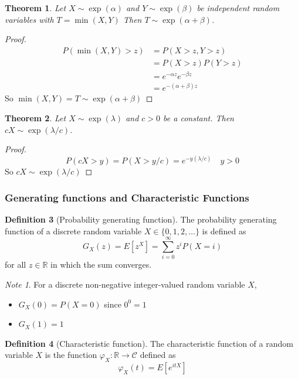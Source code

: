 \documentclass{article}
\theoremstyle{plain}
\newtheorem{theorem}{Theorem}[section]
\theoremstyle{definition}
\newtheorem{defn}[theorem]{Definition}
\theoremstyle{remark}
\newtheorem{note}{Note}
\numberwithin{equation}{section}
\newcommand{\R}{\mathbb{R}}
\newcommand{\Cs}{\mathcal{C}}
\begin{document}
\begin{theorem}\label{thm:exp_t_cond}
Let $X \sim \exp(\alpha)$ and $Y \sim \exp(\beta)$ be independent random variables with $T = \min(X,Y)$
Then $T \sim \exp(\alpha + \beta)$.
\end{theorem}

\begin{proof}
\begin{align*}
    P(\min(X,Y) > z) &= P(X > z, Y > z)\\
    &= P(X > z) P(Y > z)\\
    &= e^{-\alpha z} e^{-\beta z}\\
    &= e^{-(\alpha + \beta) z}
\end{align*}
So $\min(X,Y) = T \sim \exp(\alpha + \beta)$
\end{proof}

\begin{theorem} \label{thm:exp_scaling}
Let $X \sim \exp(\lambda)$ and $c > 0$ be a constant.
Then $cX \sim \exp(\lambda/c)$.
\end{theorem}

\begin{proof}
$$
    P(cX > y) = P(X > y/c) = e^{-y (\lambda/c)} \quad y > 0
$$
So $cX \sim \exp(\lambda/c)$
\end{proof}

\subsubsection{Generating functions and Characteristic Functions}

\begin{defn}[Probability generating function]
The probability generating function of a discrete random variable $X \in \{0,1,2, \ldots\}$ is defined as
$$
G_X(z) = E[z^X] = \sum_{i = 0}^\infty z^i P(X = i)
$$
for all $z \in \R$ in which the sum converges.
\end{defn}

\begin{note}
For a discrete non-negative integer-valued random variable $X$,
\begin{itemize}
    \item $G_X(0) = P(X = 0)$ since $0^0 = 1$
    \item $G_X(1) = 1$
\end{itemize}
\end{note}

\begin{defn}[Characteristic function]
The characteristic function of a random variable $X$ is the function $\varphi_X : \R \to \Cs$ defined as
$$
\varphi_X(t) = E[e^{itX}]
$$
\end{defn}
\end{document}
